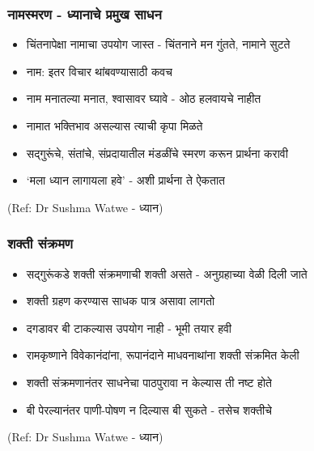 \begin{frame}[fragile]\frametitle{नामस्मरण - ध्यानाचे प्रमुख साधन}

	\begin{itemize}
	\item चिंतनापेक्षा नामाचा उपयोग जास्त - चिंतनाने मन गुंतते, नामाने सुटते
	\item नाम: इतर विचार थांबवण्यासाठी कवच
	\item नाम मनातल्या मनात, श्वासावर घ्यावे - ओठ हलवायचे नाहीत
	\item नामात भक्तिभाव असल्यास त्याची कृपा मिळते
	\item सद्गुरूंचे, संतांचे, संप्रदायातील मंडळींचे स्मरण करून प्रार्थना करावी
	\item `मला ध्यान लागायला हवे' - अशी प्रार्थना ते ऐकतात
	\end{itemize}

{\tiny (Ref: Dr Sushma Watwe - ध्यान)}

\end{frame}

\begin{frame}[fragile]\frametitle{शक्ती संक्रमण}

	\begin{itemize}
	\item सद्गुरूंकडे शक्ती संक्रमणाची शक्ती असते - अनुग्रहाच्या वेळी दिली जाते
	\item शक्ती ग्रहण करण्यास साधक पात्र असावा लागतो
	\item दगडावर बी टाकल्यास उपयोग नाही - भूमी तयार हवी
	\item रामकृष्णाने विवेकानंदांना, रूपानंदाने माधवनाथांना शक्ती संक्रमित केली
	\item शक्ती संक्रमणानंतर साधनेचा पाठपुरावा न केल्यास ती नष्ट होते
	\item बी पेरल्यानंतर पाणी-पोषण न दिल्यास बी सुकते - तसेच शक्तीचे
	\end{itemize}

{\tiny (Ref: Dr Sushma Watwe - ध्यान)}

\end{frame}

